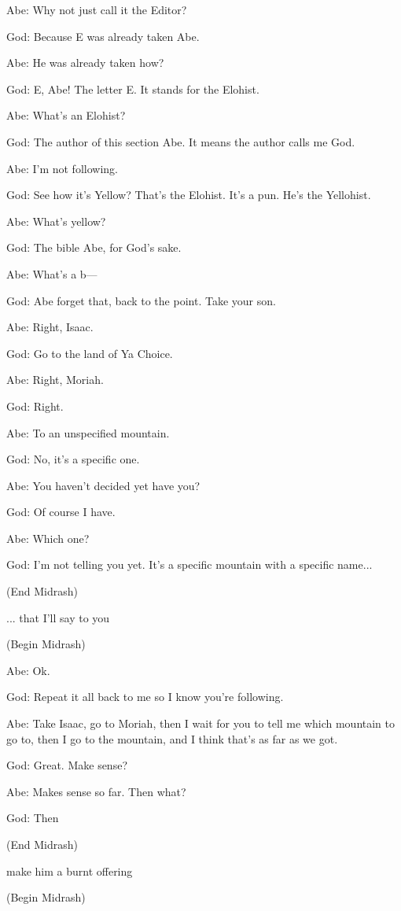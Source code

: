 {	Abe: Why not just call it the Editor?

	God: Because E was already taken Abe.

	Abe: He was already taken how?

	God: E, Abe! The letter E. It stands for the Elohist.

	Abe: What's an Elohist?

	God: The author of this section Abe. It means the author calls me God.

	Abe: I'm not following.

	God: See how it's Yellow? That's the Elohist. It's a pun. He's the Yellohist.

	Abe: What's yellow?

	God: The bible Abe, for God's sake.

	Abe: What's a b---

	God: Abe forget that, back to the point. Take your son.

	Abe: Right, Isaac.

	God: Go to the land of Ya Choice.

	Abe: Right, Moriah.

	God: Right.

	Abe: To an unspecified mountain.

	God: No, it's a specific one.

	Abe: You haven't decided yet have you?

	God: Of course I have.

	Abe: Which one?

	God: I'm not telling you yet. It's a specific mountain with a specific name...

	(End Midrash)

	... that I'll say to you

	(Begin Midrash)

	Abe: Ok.

	God: Repeat it all back to me so I know you're following.

	Abe: Take Isaac, go to Moriah, then I wait for you to tell me which mountain to go to, then I go to the mountain, and I think that's as far as we got.

	God: Great. Make sense?

	Abe: Makes sense so far. Then what?

	God: Then

	(End Midrash)

	make him a burnt offering

	(Begin Midrash)

}
